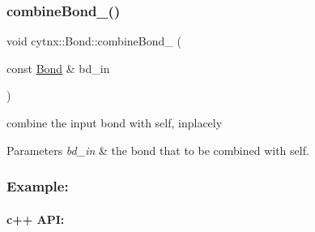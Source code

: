 \subsubsection{\texorpdfstring{combine\+Bond\+\_\+()}{combineBond\_()}}
{\footnotesize\ttfamily void cytnx\+::\+Bond\+::combine\+Bond\+\_\+ (\begin{DoxyParamCaption}\item[{const \hyperlink{classcytnx_1_1Bond}{Bond} \&}]{bd\+\_\+in }\end{DoxyParamCaption})\hspace{0.3cm}{\ttfamily [inline]}}



combine the input bond with self, inplacely 


\begin{DoxyParams}{Parameters}
{\em bd\+\_\+in} & the bond that to be combined with self.\\
\hline
\end{DoxyParams}
\subsubsection*{Example\+:}

\paragraph*{c++ A\+PI\+:}


